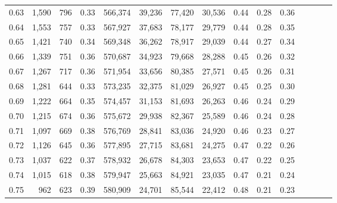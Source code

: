 \begin{tabular}{rrrcrrrrrrrrrrr}
0.63 &   1,590 &     796 &                                       0.33 &  566,374 &   39,236 &   77,420 &   30,536 &  0.44 &  0.28 &                         0.36 \\
0.64 &   1,553 &     757 &                                       0.33 &  567,927 &   37,683 &   78,177 &   29,779 &  0.44 &  0.28 &                         0.35 \\
0.65 &   1,421 &     740 &                                       0.34 &  569,348 &   36,262 &   78,917 &   29,039 &  0.44 &  0.27 &                         0.34 \\
0.66 &   1,339 &     751 &                                       0.36 &  570,687 &   34,923 &   79,668 &   28,288 &  0.45 &  0.26 &                         0.32 \\
0.67 &   1,267 &     717 &                                       0.36 &  571,954 &   33,656 &   80,385 &   27,571 &  0.45 &  0.26 &                         0.31 \\
0.68 &   1,281 &     644 &                                       0.33 &  573,235 &   32,375 &   81,029 &   26,927 &  0.45 &  0.25 &                         0.30 \\
0.69 &   1,222 &     664 &                                       0.35 &  574,457 &   31,153 &   81,693 &   26,263 &  0.46 &  0.24 &                         0.29 \\
0.70 &   1,215 &     674 &                                       0.36 &  575,672 &   29,938 &   82,367 &   25,589 &  0.46 &  0.24 &                         0.28 \\
0.71 &   1,097 &     669 &                                       0.38 &  576,769 &   28,841 &   83,036 &   24,920 &  0.46 &  0.23 &                         0.27 \\
0.72 &   1,126 &     645 &                                       0.36 &  577,895 &   27,715 &   83,681 &   24,275 &  0.47 &  0.22 &                         0.26 \\
0.73 &   1,037 &     622 &                                       0.37 &  578,932 &   26,678 &   84,303 &   23,653 &  0.47 &  0.22 &                         0.25 \\
0.74 &   1,015 &     618 &                                       0.38 &  579,947 &   25,663 &   84,921 &   23,035 &  0.47 &  0.21 &                         0.24 \\
0.75 &     962 &     623 &                                       0.39 &  580,909 &   24,701 &   85,544 &   22,412 &  0.48 &  0.21 &                         0.23 \\

\end{tabular}
